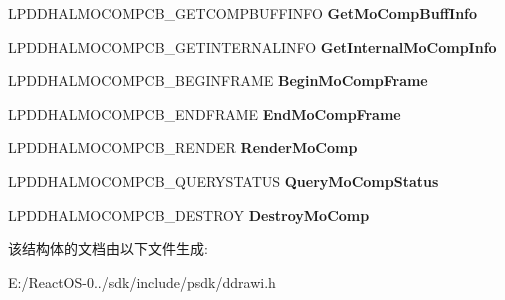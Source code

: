 \begin{DoxyCompactItemize}
\mbox{\label{struct___d_d_h_a_l___d_d_m_o_t_i_o_n_c_o_m_p_c_a_l_l_b_a_c_k_s_a7489a266d42fcdeaad44d3a75da52ff8}} 
L\+P\+D\+D\+H\+A\+L\+M\+O\+C\+O\+M\+P\+C\+B\+\_\+\+G\+E\+T\+C\+O\+M\+P\+B\+U\+F\+F\+I\+N\+FO {\bfseries Get\+Mo\+Comp\+Buff\+Info}
\item 
\mbox{\label{struct___d_d_h_a_l___d_d_m_o_t_i_o_n_c_o_m_p_c_a_l_l_b_a_c_k_s_ac8672f2c9ecd6a9e712d990ba0e92c50}} 
L\+P\+D\+D\+H\+A\+L\+M\+O\+C\+O\+M\+P\+C\+B\+\_\+\+G\+E\+T\+I\+N\+T\+E\+R\+N\+A\+L\+I\+N\+FO {\bfseries Get\+Internal\+Mo\+Comp\+Info}
\item 
\mbox{\label{struct___d_d_h_a_l___d_d_m_o_t_i_o_n_c_o_m_p_c_a_l_l_b_a_c_k_s_a6ebcf6087e3f82b4a023ed00a879534a}} 
L\+P\+D\+D\+H\+A\+L\+M\+O\+C\+O\+M\+P\+C\+B\+\_\+\+B\+E\+G\+I\+N\+F\+R\+A\+ME {\bfseries Begin\+Mo\+Comp\+Frame}
\item 
\mbox{\label{struct___d_d_h_a_l___d_d_m_o_t_i_o_n_c_o_m_p_c_a_l_l_b_a_c_k_s_a49cb25c7ff0b180eb4ba7580c6b48633}} 
L\+P\+D\+D\+H\+A\+L\+M\+O\+C\+O\+M\+P\+C\+B\+\_\+\+E\+N\+D\+F\+R\+A\+ME {\bfseries End\+Mo\+Comp\+Frame}
\item 
\mbox{\label{struct___d_d_h_a_l___d_d_m_o_t_i_o_n_c_o_m_p_c_a_l_l_b_a_c_k_s_a5aad8b4e5c0fe5bd319766ac59f33265}} 
L\+P\+D\+D\+H\+A\+L\+M\+O\+C\+O\+M\+P\+C\+B\+\_\+\+R\+E\+N\+D\+ER {\bfseries Render\+Mo\+Comp}
\item 
\mbox{\label{struct___d_d_h_a_l___d_d_m_o_t_i_o_n_c_o_m_p_c_a_l_l_b_a_c_k_s_a494d12c79c98dd66d1634e4246f51340}} 
L\+P\+D\+D\+H\+A\+L\+M\+O\+C\+O\+M\+P\+C\+B\+\_\+\+Q\+U\+E\+R\+Y\+S\+T\+A\+T\+US {\bfseries Query\+Mo\+Comp\+Status}
\item 
\mbox{\label{struct___d_d_h_a_l___d_d_m_o_t_i_o_n_c_o_m_p_c_a_l_l_b_a_c_k_s_a2b974703119a09efa03a0161f0f17afa}} 
L\+P\+D\+D\+H\+A\+L\+M\+O\+C\+O\+M\+P\+C\+B\+\_\+\+D\+E\+S\+T\+R\+OY {\bfseries Destroy\+Mo\+Comp}
\end{DoxyCompactItemize}


该结构体的文档由以下文件生成\+:\begin{DoxyCompactItemize}
\item 
E\+:/\+React\+O\+S-\/0../sdk/include/psdk/ddrawi.\+h\end{DoxyCompactItemize}
